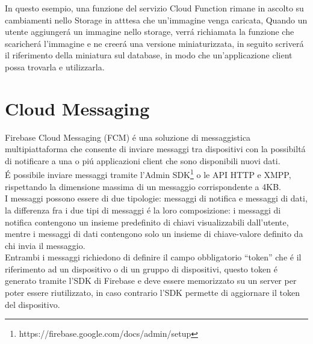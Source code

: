 In questo esempio, una funzione del servizio Cloud Function rimane in ascolto su cambiamenti nello Storage in atttesa che un'immagine venga caricata, Quando un utente aggiunger\'a un immagine nello storage, verr\'a richiamata la funzione che scaricher\'a l'immagine e ne creer\'a una versione miniaturizzata, in seguito scriver\'a il riferimento della miniatura sul database, in modo che un'applicazione client possa trovarla e utilizzarla.\\
%
%

\newpage
\section{Cloud Messaging}                 %
Firebase Cloud Messaging (FCM) \'e una soluzione di messaggistica multipiattaforma che consente di inviare messaggi tra dispositivi con la possibilt\'a di notificare a una o pi\'u applicazioni client che sono disponibili nuovi dati.\\
\'E possibile inviare messaggi tramite l'Admin SDK\footnote{https://firebase.google.com/docs/admin/setup} o le API HTTP e XMPP, rispettando la dimensione massima di un messaggio corrispondente a 4KB.\\
I messaggi possono essere di due tipologie: messaggi di notifica e messaggi di dati, la differenza fra i due tipi di messaggi \'e la loro composizione: i messaggi di notifica contengono un insieme predefinito di chiavi visualizzabili dall'utente, mentre i messaggi di dati contengono solo un insieme di chiave-valore definito da chi invia il messaggio.\\
Entrambi i messaggi richiedono di definire il campo obbligatorio ``token'' che \'e il riferimento ad un dispositivo o di un gruppo di dispositivi, questo token \'e generato tramite l'SDK di Firebase e deve essere memorizzato su un server per poter essere riutilizzato, in caso contrario l'SDK permette di aggiornare il token del dispositivo.

